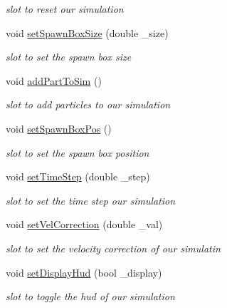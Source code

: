 \begin{DoxyCompactItemize}
\begin{DoxyCompactList}\small\item\em slot to reset our simulation \end{DoxyCompactList}\item 
void \hyperlink{class_fluid_prop_dock_widget_ae59c72dfb12faf77940e805e94b78cbf}{set\-Spawn\-Box\-Size} (double \-\_\-size)
\begin{DoxyCompactList}\small\item\em slot to set the spawn box size \end{DoxyCompactList}\item 
\hypertarget{class_fluid_prop_dock_widget_a1e3b987049f5f5ff5958a7cd3dcdbdff}{void \hyperlink{class_fluid_prop_dock_widget_a1e3b987049f5f5ff5958a7cd3dcdbdff}{add\-Part\-To\-Sim} ()}\label{class_fluid_prop_dock_widget_a1e3b987049f5f5ff5958a7cd3dcdbdff}

\begin{DoxyCompactList}\small\item\em slot to add particles to our simulation \end{DoxyCompactList}\item 
\hypertarget{class_fluid_prop_dock_widget_aac86685277d0b7f6c631e5f53efdc247}{void \hyperlink{class_fluid_prop_dock_widget_aac86685277d0b7f6c631e5f53efdc247}{set\-Spawn\-Box\-Pos} ()}\label{class_fluid_prop_dock_widget_aac86685277d0b7f6c631e5f53efdc247}

\begin{DoxyCompactList}\small\item\em slot to set the spawn box position \end{DoxyCompactList}\item 
void \hyperlink{class_fluid_prop_dock_widget_a03628de74620c25af71461a255163a84}{set\-Time\-Step} (double \-\_\-step)
\begin{DoxyCompactList}\small\item\em slot to set the time step our simulation \end{DoxyCompactList}\item 
void \hyperlink{class_fluid_prop_dock_widget_a7c06460036dcca6716dea7b7fc70ad66}{set\-Vel\-Correction} (double \-\_\-val)
\begin{DoxyCompactList}\small\item\em slot to set the velocity correction of our simulatin \end{DoxyCompactList}\item 
void \hyperlink{class_fluid_prop_dock_widget_a6e6423b9cdf21dd02577b72339d5babd}{set\-Display\-Hud} (bool \-\_\-display)
\begin{DoxyCompactList}\small\item\em slot to toggle the hud of our simulation \end{DoxyCompactList}\end{DoxyCompactItemize}
